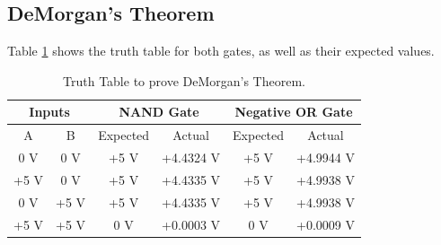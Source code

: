 \documentclass{report}
\begin{document}
	\subsection{DeMorgan's Theorem}
	Table \ref{section2} shows the truth table for both gates, as well as their expected values.
	\begin{table}[h]
		\centering
		\begin{tabular}{@{}cc|cc|cc@{}}
			\toprule
			\multicolumn{2}{c|}{Inputs} & \multicolumn{2}{c|}{NAND Gate} & \multicolumn{2}{c}{Negative OR Gate} \\ \midrule
			A            & B            & Expected      & Actual         & Expected         & Actual            \\ \midrule
			0 V          & 0 V          & +5 V          & +4.4324 V      & +5 V             & +4.9944 V         \\
			+5 V         & 0 V          & +5 V          & +4.4335 V      & +5 V             & +4.9938 V         \\
			0 V          & +5 V         & +5 V          & +4.4335 V      & +5 V             & +4.9938 V         \\
			+5 V         & +5 V         & 0 V           & +0.0003 V      & 0 V              & +0.0009 V         \\ \bottomrule
		\end{tabular}
		\caption{Truth Table to prove DeMorgan's Theorem.}
		\label{section2}
	\end{table}
	
	\newpage
\end{document}
